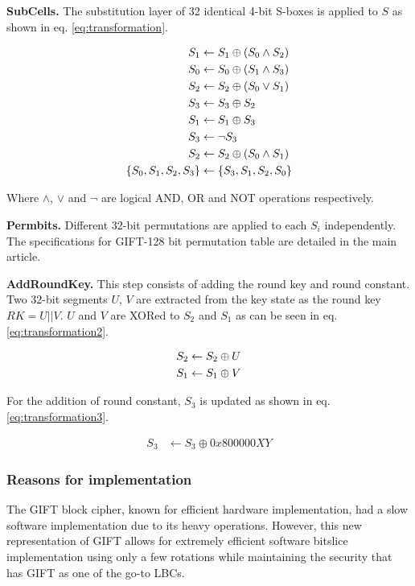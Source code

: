 \documentclass[conference]{IEEEtran}
\begin{document}
\textbf{SubCells.} The substitution layer of 32 identical 4-bit S-boxes is applied to $S$ as shown in eq. \ref{eq:transformation}.

\begin{align}
  S_1 &\leftarrow S_1 \oplus (S_0 \land S_2) \notag \\
  S_0 &\leftarrow S_0 \oplus (S_1 \land S_3) \notag \\
  S_2 &\leftarrow S_2 \oplus (S_0 \lor S_1) \notag \\
  S_3 &\leftarrow S_3 \oplus S_2 \notag \\
  S_1 &\leftarrow S_1 \oplus S_3 \label{eq:transformation} \\
  S_3 &\leftarrow \neg S_3 \notag \\
  S_2 &\leftarrow S_2 \oplus (S_0 \land S_1) \notag \\
  \{S_0, S_1, S_2, S_3\} &\leftarrow \{S_3, S_1, S_2, S_0\} \notag
\end{align}

Where $\land$, $\lor$ and $\neg$ are logical AND, OR and NOT operations respectively.

\textbf{Permbits.} Different 32-bit permutations are applied to each $S_i$ independently. The specifications for GIFT-128 bit permutation table are detailed in the main article\cite{adomnicai2020fixslicing}.

\textbf{AddRoundKey.} This step consists of adding the round key and round constant. Two 32-bit segments $U$, $V$ are extracted from the key state as the round key $RK = U||V$. $U$ and $V$ are XORed to $S_2$ and $S_1$ as can be seen in eq. \ref{eq:transformation2}.

\begin{align}
  S_2 &\leftarrow S_2 \oplus U  \notag \\ 
  S_1 &\leftarrow S_1 \oplus V \label{eq:transformation2}
\end{align}

For the addition of round constant, $S_3$ is updated as shown in eq. \ref{eq:transformation3}.

\begin{align}
  S_3 &\leftarrow S_3 \oplus 0x800000XY \label{eq:transformation3}
\end{align}

\subsubsection{Reasons for implementation}

The GIFT block cipher, known for efficient hardware implementation, had a slow software implementation due to its heavy operations. However, this new representation of GIFT allows for extremely efficient software bitslice implementation using only a few rotations while maintaining the security that has GIFT as one of the go-to LBCs.
\end{document}
